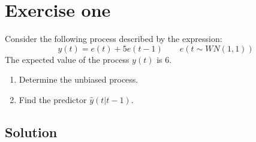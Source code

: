 \section{Exercise one}

Consider the following process described by the expression:
\[y(t)=e(t)+5e(t-1)\qquad e(t\sim WN(1,1))\]
The expected value of the process $y(t)$ is 6. 
\begin{enumerate}
    \item Determine the unbiased process.
    \item Find the predictor $\hat{y}(t|t-1)$. 
\end{enumerate}

\subsection*{Solution}
